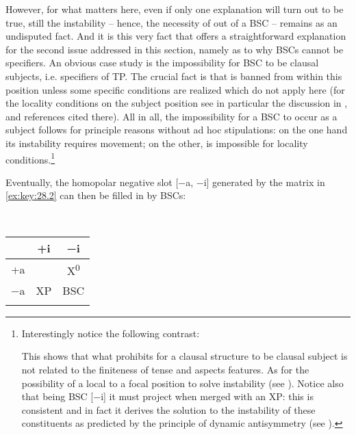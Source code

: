 \documentclass[output=paper]{langsci/langscibook}
\begin{document}
However, for what matters here, even if only one explanation will turn out to
be true, still the instability – hence, the necessity of  out of a \gls{BSC}
– remains as an undisputed fact. And it is this very fact that offers a
straightforward explanation for the second issue addressed in this section,
namely as to why \glspl{BSC} cannot be specifiers. An obvious case study is the
impossibility for \gls{BSC} to be clausal subjects, i.e. specifiers of TP.  The
crucial fact is that  is banned from within this position unless some
specific conditions are realized which do not apply here (for the locality
conditions on the subject position see in particular the discussion in
\citealt{Rizzi2015}, \citealt{Stepanov2007} and references cited there). All
in all, the impossibility for a \gls{BSC} to occur as a subject follows for principle
reasons without ad hoc stipulations: on the one hand its instability requires
movement; on the other,  is impossible for locality
conditions.\footnote{Interestingly notice the following contrast:

\begin{exe}
    \begin{xlist}
    \end{xlist}
\end{exe}

This shows that what prohibits for a clausal structure to be clausal subject is
not related to the finiteness of tense and aspects features. As for the
possibility of a local  to a focal position to solve instability (see
\citealt{Moro2009}). Notice also that being \gls{BSC} [−i] it must project when merged
with an XP\@: this is consistent and in fact it derives the solution to the
instability of these constituents as predicted by the principle of dynamic
antisymmetry (see
\citealt{Moro2000,Moro2009,Chomsky2013,Chomsky2017,ChoGalOtt2019,Rizzi2015,Rizzi2016}).}

Eventually, the homopolar negative slot [−a, −i] generated by the matrix in
\eqref{ex:key:28.2} can then be filled in by \glspl{BSC}:

\ea\label{ex:key:28.4}\leavevmode\\[-1\baselineskip]
    \begin{tabular}{ccc}
    \lsptoprule
                & +i & −i\\
    \midrule
    +a &             & X\textsuperscript{0}\\
    −a & XP          & BSC\\
    \lspbottomrule
    \end{tabular}
\z
\end{document}
